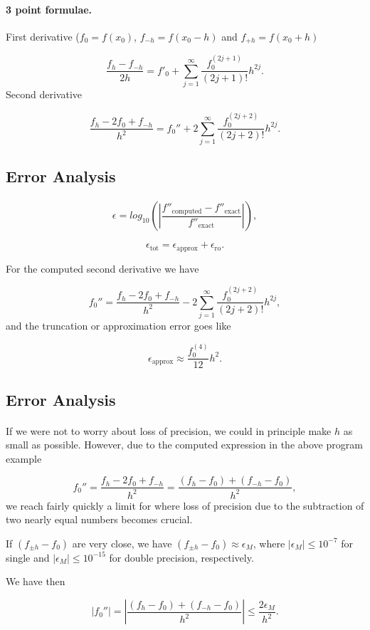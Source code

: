 \documentclass[%
twoside,                 %
final,                   %
10pt]{article}
\newenvironment{paragraphadmon}[1][]{\paragraph{#1}}{}
\begin{document}
\begin{paragraphadmon}[3 point formulae.]
First derivative  ($f_0 = f(x_0)$, $f_{-h}=f(x_0-h)$ and $f_{+h}=f(x_0+h)$

\[
   \frac{f_h-f_{-h}}{2h}=f'_0+\sum_{j=1}^{\infty}\frac{f_0^{(2j+1)}}{(2j+1)!}h^{2j}.
\]
Second derivative

\[
 \frac{ f_h -2f_0 +f_{-h}}{h^2}=f_0''+2\sum_{j=1}^{\infty}\frac{f_0^{(2j+2)}}{(2j+2)!}h^{2j}.
\]
\end{paragraphadmon}



\subsection{Error Analysis}


\begin{paragraphadmon}[]
\[
   \epsilon=log_{10}\left(\left|\frac{f''_{\mbox{computed}}-f''_{\mbox{exact}}}
                 {f''_{\mbox{exact}}}\right|\right),
\]

\[
   \epsilon_{\mbox{tot}}=\epsilon_{\mbox{approx}}+\epsilon_{\mbox{ro}}.
\]

For the computed second derivative  we have

\[
 f_0''=\frac{ f_h -2f_0 +f_{-h}}{h^2}-2\sum_{j=1}^{\infty}\frac{f_0^{(2j+2)}}{(2j+2)!}h^{2j},
\]
and the truncation or approximation error goes like

\[
  \epsilon_{\mbox{approx}}\approx \frac{f_0^{(4)}}{12}h^{2}.
\]
\end{paragraphadmon}



\subsection{Error Analysis}


\begin{paragraphadmon}[]
If we were not to worry about loss of precision, we could in principle
make $h$ as small as possible.
However, due to the computed expression in the above program example

\[
 f_0''=\frac{ f_h -2f_0 +f_{-h}}{h^2}=\frac{ (f_h -f_0) +(f_{-h}-f_0)}{h^2},
\]
we reach fairly quickly a limit for where loss of precision due to the subtraction
of two nearly equal numbers becomes crucial.

If $(f_{\pm h} -f_0)$ are very close, we have
$(f_{\pm h} -f_0)\approx \epsilon_M$, where $|\epsilon_M|\le 10^{-7}$ for single and
$|\epsilon_M|\le 10^{-15}$ for double precision, respectively.

We have then

\[
 \left|f_0''\right|=
 \left|\frac{ (f_h -f_0) +(f_{-h}-f_0)}{h^2}\right|\le \frac{ 2 \epsilon_M}{h^2}.
\]
\end{paragraphadmon}
\end{document}
